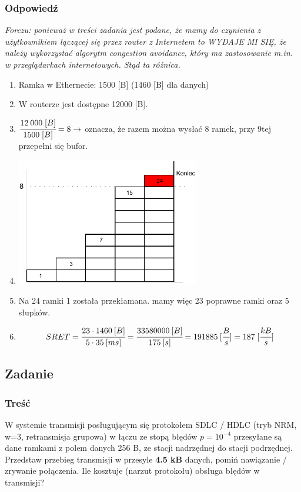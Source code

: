 		\subsubsection{Odpowiedź}
			{\small \emph{Forczu: ponieważ w treści zadania jest podane, że mamy do czynienia z użytkownikiem łączącej się przez router z Internetem to WYDAJE MI SIĘ, że należy wykorzystać algorytm \emph{congestion avoidance}, który ma zastosowanie m.in. w przeglądarkach internetowych. Stąd ta różnica.}}\\
			\begin{enumerate}
				\item Ramka w Ethernecie: 1500 [B] (1460 [B] dla danych)
				\item W routerze jest dostępne 12000 [B].
				\item $ \cfrac{12\:000\;[B]}{1500\;[B]}=8 \rightarrow $ oznacza, że razem można wysłać 8 ramek, przy 9tej przepełni się bufor.
				\item \includegraphics[width=8.0cm]{./images/zadanie15.pdf}
				\item Na 24 ramki 1 została przekłamana. mamy więc 23 poprawne ramki oraz 5 słupków.
				\item $$ SRET=\cfrac{23\cdot1460\:[B]}{5\cdot35\:[ms]}=\cfrac{33580000\:[B]}{175\:[s]}=191885\:[\cfrac{B}{s}]=187\;[\cfrac{kB}{s}] $$
			\end{enumerate}
			
\newpage
	\subsection{Zadanie}
		\subsubsection{Treść}
			W systemie transmisji posługującym się protokołem SDLC / HDLC (tryb NRM, w=3, retransmisja grupowa) w łączu ze stopą błędów $ p=10^{-4} $ przesyłane są dane ramkami z polem danych 256 B, ze stacji nadrzędnej do stacji podrzędnej. Przedstaw przebieg transmisji w przesyle \textbf{4.5 kB} danych, pomiń nawiązanie / zrywanie połączenia. Ile kosztuje (narzut protokołu) obsługa błędów w transmisji?
